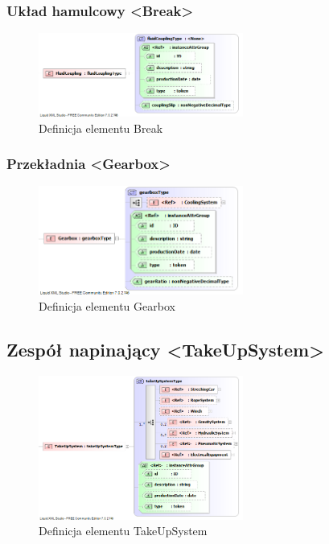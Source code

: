 \documentclass[12pt,a4paper]{article}
\begin{document}
\subsubsection{Układ hamulcowy <Break>}

\begin{figure}[h]
  \centering
  \includegraphics[width=0.6\textwidth]{png/liquid/FluidCoupling}
  \caption{Definicja elementu Break}
  \label{fig:break-xsd}
\end{figure}


\subsubsection{Przekładnia <Gearbox>}

\begin{figure}[h]
  \centering
  \includegraphics[width=0.6\textwidth]{png/liquid/Gearbox}
  \caption{Definicja elementu Gearbox}
  \label{fig:gearbox-xsd}
\end{figure}


\subsection{Zespół napinający <TakeUpSystem>}

\begin{figure}[h]
  \centering
  \includegraphics[width=0.6\textwidth]{png/liquid/TakeUpSystem}
  \caption{Definicja elementu TakeUpSystem}
  \label{fig:takeUpSystem-xsd}
\end{figure}
\end{document}
